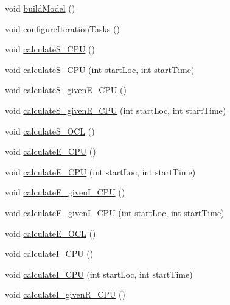 \begin{DoxyCompactItemize}
\item 
void \hyperlink{classSpatialSEIR_1_1ModelContext_a9776db643c897f78fcf69ac7aef5900a}{build\-Model} ()
\item 
void \hyperlink{classSpatialSEIR_1_1ModelContext_a997a0c014e321b460f676aedb905a443}{configure\-Iteration\-Tasks} ()
\item 
void \hyperlink{classSpatialSEIR_1_1ModelContext_a6c5a9fdce69c12aa31bd4427b2245c50}{calculate\-S\-\_\-\-C\-P\-U} ()
\item 
void \hyperlink{classSpatialSEIR_1_1ModelContext_a0cd4a5adb3527d661b9bf0b5f1b2e45b}{calculate\-S\-\_\-\-C\-P\-U} (int start\-Loc, int start\-Time)
\item 
void \hyperlink{classSpatialSEIR_1_1ModelContext_a2e1b237f14f7577cc3b6796e79ce48f3}{calculate\-S\-\_\-given\-E\-\_\-\-C\-P\-U} ()
\item 
void \hyperlink{classSpatialSEIR_1_1ModelContext_a1f0d751d6c345b05cdaaab5c71fff2fd}{calculate\-S\-\_\-given\-E\-\_\-\-C\-P\-U} (int start\-Loc, int start\-Time)
\item 
void \hyperlink{classSpatialSEIR_1_1ModelContext_a2bffe866c20248be9387acf669342801}{calculate\-S\-\_\-\-O\-C\-L} ()
\item 
void \hyperlink{classSpatialSEIR_1_1ModelContext_a7edf0be808e865dbfe118c115de94d3a}{calculate\-E\-\_\-\-C\-P\-U} ()
\item 
void \hyperlink{classSpatialSEIR_1_1ModelContext_adc45f875f781c504f0e2b3b5e38e3eb1}{calculate\-E\-\_\-\-C\-P\-U} (int start\-Loc, int start\-Time)
\item 
void \hyperlink{classSpatialSEIR_1_1ModelContext_ab56f005ed4968fc904755692b82eb5ec}{calculate\-E\-\_\-given\-I\-\_\-\-C\-P\-U} ()
\item 
void \hyperlink{classSpatialSEIR_1_1ModelContext_a9eaba7d0cce22b9f10942e4c5315034e}{calculate\-E\-\_\-given\-I\-\_\-\-C\-P\-U} (int start\-Loc, int start\-Time)
\item 
void \hyperlink{classSpatialSEIR_1_1ModelContext_a0da1ddb3f08c92bc7bca2587477e7bb3}{calculate\-E\-\_\-\-O\-C\-L} ()
\item 
void \hyperlink{classSpatialSEIR_1_1ModelContext_a9f1196b7021e36e4bdfa85b8e5d8e982}{calculate\-I\-\_\-\-C\-P\-U} ()
\item 
void \hyperlink{classSpatialSEIR_1_1ModelContext_a877a56e859bd275a9e4a1a77c9363013}{calculate\-I\-\_\-\-C\-P\-U} (int start\-Loc, int start\-Time)
\item 
void \hyperlink{classSpatialSEIR_1_1ModelContext_af3c069ad35d3f86c3dadad02bc257b53}{calculate\-I\-\_\-given\-R\-\_\-\-C\-P\-U} ()

\end{DoxyCompactItemize}
